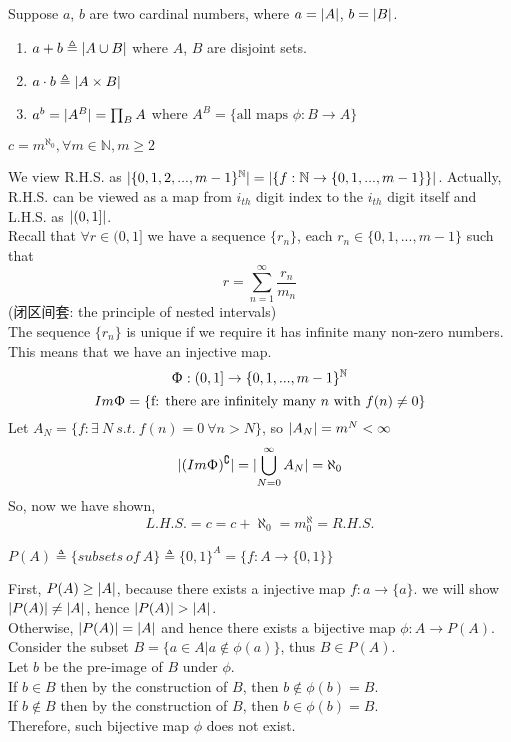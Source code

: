 \begin{myDef}
	Suppose $a$, $b$ are two cardinal numbers, where $a=\lvert A\rvert$, $b=\lvert B\rvert$.
	\begin{enumerate}
		\item $a+b\triangleq\lvert A\cup B\rvert$ where $A$, $B$ are disjoint sets.
		\item $a\cdot b\triangleq \lvert A\times B\rvert$
		\item $a^b=\lvert A^B\rvert=\prod_{B}A$ where $A^B=\{\text{all maps }\phi: B\rightarrow A\}$
	\end{enumerate}
\end{myDef}
\begin{myProp}
	$c=m^{\aleph_0}, \forall m\in \mathbb{N}, m\geq2$
\end{myProp}
\begin{myPf}
	We view R.H.S. as $\lvert\{0,1,2,...,m-1\}^{\mathbb{N}}\rvert=\lvert\{f:\mathbb{N}\rightarrow\{0,1,...,m-1\}\}\rvert$. Actually, R.H.S. can be viewed as a map from $i_{th}$ digit index to the $i_{th}$ digit itself and L.H.S. as $\lvert(0,1]\rvert$.
	\\
	Recall that $\forall r \in (0,1]$ we have a sequence $\{r_n\}$, each $r_n\in\{0,1,...,m-1\}$ such that
	\[r=\sum_{n=1}^{\infty}\frac{r_n}{m_n}\]
	(闭区间套: the principle of nested intervals)
	\\
	The sequence $\{r_n\}$ is unique if we require it has infinite many non-zero numbers.
	\\
	This means that we have an injective map.
	\[\Upphi: (0,1] \rightarrow \{0,1,...,m-1\}^\mathbb{N}\]
	\[Im\Upphi=\{\text{f: there are infinitely many $n$ with $f(n)\neq0$}\}\]
	Let $A_N=\{f:\exists\ N\ s.t.\ f(n)=0\ \forall n>N\}$, so $\lvert A_N\rvert=m^N<\infty$
	\[\lvert(Im\Upphi)^\complement\rvert=\lvert\bigcup_{N=0}^\infty A_N\rvert=\aleph_0\]
	So, now we have shown,
	\[L.H.S.=c=c+\aleph_0=m^\aleph_0=R.H.S.\]
\end{myPf}
\begin{myDef}
	$P(A)\triangleq \{subsets\ of\ A\}\triangleq\{0,1\}^A=\{f: A\rightarrow \{0,1\}\}$
\end{myDef}
\begin{myTheo}[$P(A)>\abs{A}$]
	First, $P(A)\geq\lvert A\rvert$, because there exists a injective map $f: a\rightarrow \{a\}$. we will show $\lvert P(A)\rvert\neq \lvert A\rvert$, hence $\lvert P(A)\rvert>\lvert A\rvert$.
	\\
	Otherwise, $\lvert P(A)\rvert=\lvert A\rvert$ and hence there exists a bijective map $\phi: A\rightarrow P(A)$.
	\\
	Consider the subset $B=\{a\in A|a\notin \phi(a)\}$, thus $B\in P(A)$.
	\\
	Let $b$ be the pre-image of $B$ under $\phi$.
	\\
	If $b\in B$ then by the construction of $B$, then $b\notin \phi(b)=B$.
	\\
	If $b\notin B$ then by the construction of $B$, then $b\in \phi(b)=B$.
	\\
	Therefore, such bijective map $\phi$ does not exist.
\end{myTheo}
